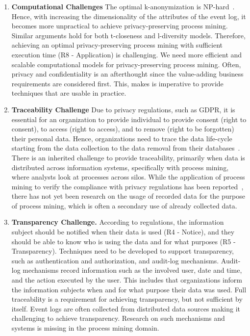 \documentclass[manuscript]{acmart}
\begin{document}
\begin{enumerate}
\item \textbf{Computational Challenges}
The optimal k-anonymization is NP-hard~\cite{meyerson2004complexity}. Hence, with increasing the dimensionality of the attributes of the event log, it becomes more unpractical to achieve privacy-preserving process mining. Similar arguments hold for both t-closeness and l-diversity models. Therefore, achieving an optimal privacy-preserving process mining with sufficient execution time (R8 - Application) is challenging. We need more efficient and scalable computational models for privacy-preserving process mining. Often, privacy and confidentiality is an afterthought since the value-adding business requirements are considered first. This, makes is imperative to provide techniques that are usable in practice.

\item \textbf{Traceability Challenge}
Due to privacy regulations, such as GDPR, it is essential for an organization to provide individual to provide consent (right to consent), to access (right to access), and to remove (right to be forgotten) their personal data. Hence, organizations need to trace the data life-cycle starting from the data collection to the data removal from their databases~\cite{zaman2019process}. There is an inherited challenge to provide traceability, primarily when data is distributed across information systems, specifically with process mining, where analysts look at processes across silos. While the application of process mining to verify the compliance with privacy regulations has been reported~\cite{DBLP:journals/sncs/ZamanH20}, there has not yet been research on the usage of recorded data for the purpose of process mining, which is often a secondary use of already collected data.

\item \textbf{Transparency Challenge.}
According to regulations, the information subject should be notified when their data is used (R4 - Notice), and they should be able to know who is using the data and for what purposes (R5 - Transparency). Techniques need to be developed to support transparency, such as authentication and authorization, and audit-log mechanisms. Audit-log mechanisms record information such as the involved user, date and time, and the action executed by the user. This includes that organizations inform the information subjects when and for what purpose their data was used. Full traceability is a requirement for achieving transparency, but not sufficient by itself. Event logs are often collected from distributed data sources making it challenging to achieve transparency. Research on such mechanisms and systems is missing in the process mining domain.
\end{enumerate}
\end{document}
